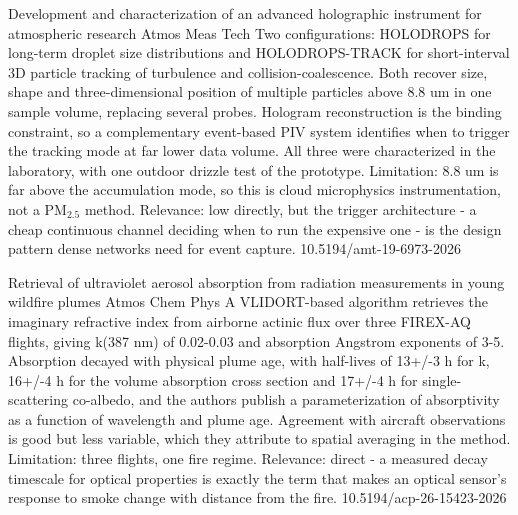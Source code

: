 \documentclass[10pt]{article}
\begin{document}
{Development and characterization of an advanced holographic instrument for atmospheric research}
{Atmos Meas Tech}
{Two configurations: HOLODROPS for long-term droplet size distributions and HOLODROPS-TRACK for short-interval 3D particle tracking of turbulence and collision-coalescence. Both recover size, shape and three-dimensional position of multiple particles above 8.8 um in one sample volume, replacing several probes. Hologram reconstruction is the binding constraint, so a complementary event-based PIV system identifies when to trigger the tracking mode at far lower data volume. All three were characterized in the laboratory, with one outdoor drizzle test of the prototype. Limitation: 8.8 um is far above the accumulation mode, so this is cloud microphysics instrumentation, not a PM$_{2.5}$ method. Relevance: low directly, but the trigger architecture - a cheap continuous channel deciding when to run the expensive one - is the design pattern dense networks need for event capture.}
{10.5194/amt-19-6973-2026}

{Retrieval of ultraviolet aerosol absorption from radiation measurements in young wildfire plumes}
{Atmos Chem Phys}
{A VLIDORT-based algorithm retrieves the imaginary refractive index from airborne actinic flux over three FIREX-AQ flights, giving k(387 nm) of 0.02-0.03 and absorption Angstrom exponents of 3-5. Absorption decayed with physical plume age, with half-lives of 13+/-3 h for k, 16+/-4 h for the volume absorption cross section and 17+/-4 h for single-scattering co-albedo, and the authors publish a parameterization of absorptivity as a function of wavelength and plume age. Agreement with aircraft observations is good but less variable, which they attribute to spatial averaging in the method. Limitation: three flights, one fire regime. Relevance: direct - a measured decay timescale for optical properties is exactly the term that makes an optical sensor's response to smoke change with distance from the fire.}
{10.5194/acp-26-15423-2026}
\end{document}
